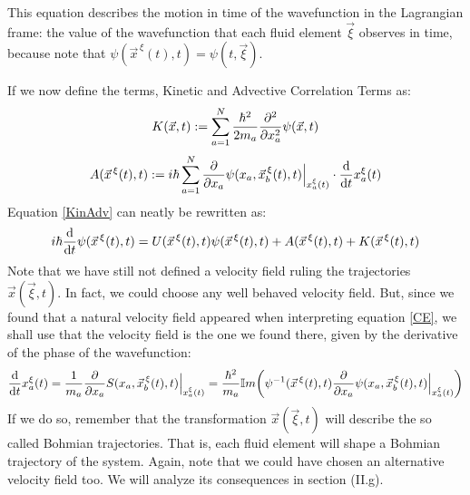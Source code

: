 \documentclass[11pt, a4paper]{article} %
\begin{document}
This equation describes the motion in time of the wavefunction in the Lagrangian frame: the value of the wavefunction that each fluid element $\vec{\xi}$ observes in time, because note that $\psi(\vec{x}^{\, \xi}(t),t)=\psi(t, \vec{\xi})$.

If we now define the terms, Kinetic and Advective Correlation Terms as:\vspace{-0.1cm}
\begin{equation}\label{Kin}
K(\vec{x},t):=\sum_{a=1}^N \frac{\hbar^2}{2m_a}\pdv[2]{}{x_a}\psi(\vec{x},t)
\end{equation}\vspace{-0.1cm}
\begin{equation}\label{Adv}
A(\vec{x}^{\, \xi}(t),t):=i\hbar \sum_{a=1}^N \pdv{}{x_a}\psi(x_a,\vec{x}_b^{\, \xi}(t), t)\Big\rvert_{x^\xi_a(t)}\cdot \dv{}{t}x^\xi_a(t)
\end{equation}
Equation \eqref{KinAdv} can neatly be rewritten as:\vspace{-0.1cm}
\begin{equation}
i\hbar \dv{}{t}\psi(\vec{x}^{\, \xi}(t),t)=U(\vec{x}^{\, \xi}(t),t)\psi(\vec{x}^{\, \xi}(t),t)+A(\vec{x}^{\, \xi}(t),t)+K(\vec{x}^{\, \xi}(t),t)\vspace{-0.1cm}
\end{equation}
Note that we have still not defined a velocity field ruling the trajectories $\vec{x}(\vec{\xi},t)$. In fact, we could choose any well behaved velocity field. But, since we found that a natural velocity field appeared when interpreting equation \eqref{CE}, we shall use that the velocity field is the one we found there, given by the derivative of the phase of the wavefunction:
\begin{equation}\label{ImpBohm}
\dv{}{t}x_a^\xi(t)=\frac{1}{m_a}\pdv{}{x_a}S(x_a, \vec{x}_b^{\, \xi}(t),t)\Big\rvert_{x^\xi_a(t)}=\frac{\hbar^2}{m_a}\mathbb{I}m \qty( \psi^{-1}(\vec{x}^{\, \xi}(t),t)\pdv{}{x_a}\psi(x_a, \vec{x}_b^{\, \xi}(t),t)\Big\rvert_{x^\xi_a(t)})
\end{equation}
 If we do so, remember that the transformation $\vec{x}(\vec{\xi},t)$ will describe the so called Bohmian trajectories. That is, each fluid element will shape a Bohmian trajectory of the system. Again, note that we could have chosen an alternative velocity field too. We will analyze its consequences in section (II.g).
\end{document}
